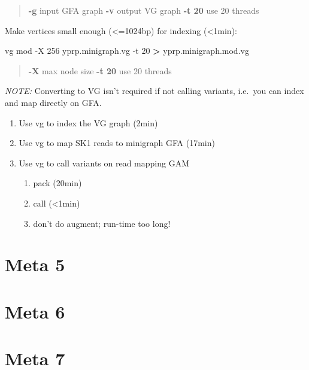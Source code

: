\documentclass[
]{book}
\newenvironment{Shaded}{\begin{snugshade}}{\end{snugshade}}
\newcommand{\AttributeTok}[1]{\textcolor[rgb]{0.77,0.63,0.00}{#1}}
\newcommand{\ExtensionTok}[1]{#1}
\newcommand{\NormalTok}[1]{#1}
\newcommand{\OperatorTok}[1]{\textcolor[rgb]{0.81,0.36,0.00}{\textbf{#1}}}
\providecommand{\tightlist}{%
  \setlength{\itemsep}{0pt}\setlength{\parskip}{0pt}}
\begin{document}
\begin{quote}
\textbf{-g} input GFA graph
\textbf{-v} output VG graph
\textbf{-t 20} use 20 threads
\end{quote}

Make vertices small enough (\textless=1024bp) for indexing (\textless1min):

\begin{Shaded}
\begin{Highlighting}[]
\ExtensionTok{vg}\NormalTok{ mod }\AttributeTok{{-}X}\NormalTok{ 256 yprp.minigraph.vg }\AttributeTok{{-}t}\NormalTok{ 20 }\OperatorTok{\textgreater{}}\NormalTok{ yprp.minigraph.mod.vg}
\end{Highlighting}
\end{Shaded}

\begin{quote}
\textbf{-X} max node size
\textbf{-t 20} use 20 threads
\end{quote}

\emph{NOTE:} Converting to VG isn't required if not calling variants, i.e.~you can index and map directly on GFA.

\begin{enumerate}
\def\labelenumi{\arabic{enumi}.}
\tightlist
\item
  Use vg to index the VG graph (2min)
\item
  Use vg to map SK1 reads to minigraph GFA (17min)
\item
  Use vg to call variants on read mapping GAM

  \begin{enumerate}
  \def\labelenumii{\alph{enumii}.}
  \tightlist
  \item
    pack (20min)
  \item
    call (\textless1min)
  \item
    don't do augment; run-time too long!
  \end{enumerate}
\end{enumerate}

\hypertarget{meta-5}{%
\chapter{Meta 5}\label{meta-5}}

\hypertarget{meta-6}{%
\chapter{Meta 6}\label{meta-6}}

\hypertarget{meta-7}{%
\chapter{Meta 7}\label{meta-7}}
\end{document}
